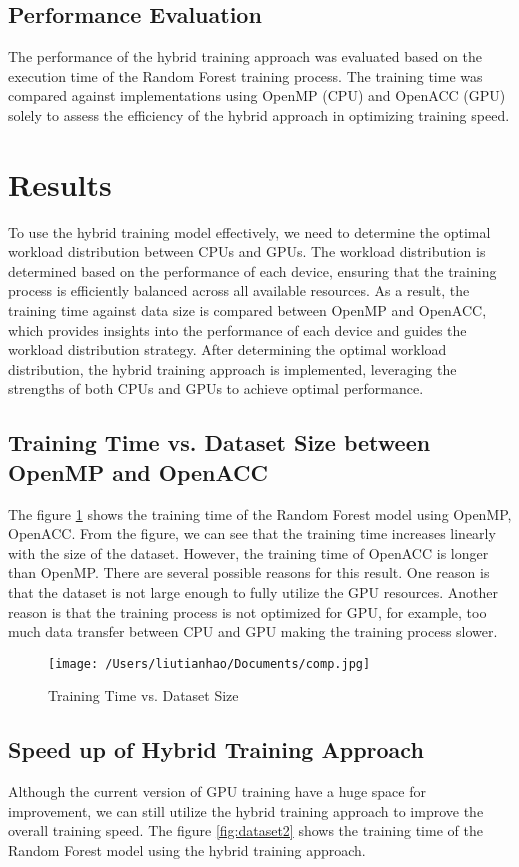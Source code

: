 \documentclass[13pt]{article}
\begin{document}
\subsection{Performance Evaluation}
The performance of the hybrid training approach was evaluated based on the execution time of the Random Forest training process.
The training time was compared against implementations using OpenMP (CPU) and OpenACC (GPU) solely to assess the efficiency of the hybrid approach in optimizing training speed.

\section{Results}
To use the hybrid training model effectively, we need to determine the optimal workload distribution between CPUs and GPUs.
The workload distribution is determined based on the performance of each device, ensuring that the training process is efficiently balanced across all available resources.
As a result, the training time against data size is compared between OpenMP and OpenACC, which provides insights into the performance of each device and guides the workload distribution strategy.
After determining the optimal workload distribution, the hybrid training approach is implemented, leveraging the strengths of both CPUs and GPUs to achieve optimal performance.

\subsection{Training Time vs. Dataset Size between OpenMP and OpenACC}
The figure \ref{fig:dataset1} shows the training time of the Random Forest model using OpenMP, OpenACC.
From the figure, we can see that the training time increases linearly with the size of the dataset. However, the training time of OpenACC is longer than OpenMP.
There are several possible reasons for this result.
One reason is that the dataset is not large enough to fully utilize the GPU resources.
Another reason is that the training process is not optimized for GPU, for example, too much data transfer between CPU and GPU making the training process slower.

\begin{figure}[h!]
    \centering
    \texttt{[image: /Users/liutianhao/Documents/comp.jpg]}
    \caption{Training Time vs. Dataset Size}
    \label{fig:dataset1}
\end{figure}

\subsection{Speed up of Hybrid Training Approach}
Although the current version of GPU training have a huge space for improvement, we can still utilize the hybrid training approach to improve the overall training speed.
The figure \ref{fig:dataset2} shows the training time of the Random Forest model using the hybrid training approach.
\end{document}
